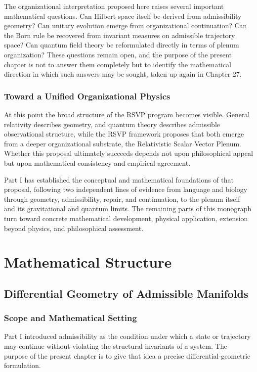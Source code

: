 \documentclass[11pt,oneside]{book}
\numberwithin{equation}{chapter}
\theoremstyle{definition}
\theoremstyle{plain}
\begin{document}
The organizational interpretation proposed here raises several important mathematical questions. Can Hilbert space itself be derived from admissibility geometry? Can unitary evolution emerge from organizational continuation? Can the Born rule be recovered from invariant measures on admissible trajectory space? Can quantum field theory be reformulated directly in terms of plenum organization? These questions remain open, and the purpose of the present chapter is not to answer them completely but to identify the mathematical direction in which such answers may be sought, taken up again in Chapter 27.

\section{Toward a Unified Organizational Physics}

At this point the broad structure of the RSVP program becomes visible. General relativity describes geometry, and quantum theory describes admissible observational structure, while the RSVP framework proposes that both emerge from a deeper organizational substrate, the Relativistic Scalar Vector Plenum. Whether this proposal ultimately succeeds depends not upon philosophical appeal but upon mathematical consistency and empirical agreement.

Part I has established the conceptual and mathematical foundations of that proposal, following two independent lines of evidence from language and biology through geometry, admissibility, repair, and continuation, to the plenum itself and its gravitational and quantum limits. The remaining parts of this monograph turn toward concrete mathematical development, physical application, extension beyond physics, and philosophical assessment.


\part{Mathematical Structure}


\chapter{Differential Geometry of Admissible Manifolds}

\section{Scope and Mathematical Setting}

Part I introduced admissibility as the condition under which a state or
trajectory may continue without violating the structural invariants of a
system. The purpose of the present chapter is to give that idea a precise
differential-geometric formulation.
\end{document}
